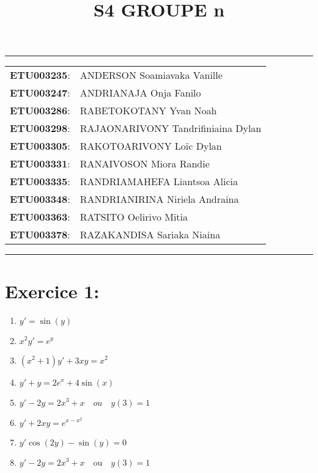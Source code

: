 \documentclass[a4paper,12pt]{article}
\begin{document}
	
\title{\textbf{S4 GROUPE n}}
\date{}
\maketitle

\hrule
\vspace{1em}

\begin{tabular}{rl}
	\textbf{ETU003235}: & ANDERSON Soamiavaka Vanille \\
	\textbf{ETU003247}: & ANDRIANAJA Onja Fanilo \\
	\textbf{ETU003286}: & RABETOKOTANY Yvan Noah \\
	\textbf{ETU003298}: & RAJAONARIVONY Tandrifiniaina Dylan \\
	\textbf{ETU003305}: & RAKOTOARIVONY Loïc Dylan \\
	\textbf{ETU003331}: & RANAIVOSON Miora Randie \\
	\textbf{ETU003335}: & RANDRIAMAHEFA Liantsoa Alicia \\
	\textbf{ETU003348}: & RANDRIANIRINA Niriela Andraina \\
	\textbf{ETU003363}: & RATSITO Oelirivo Mitia \\
	\textbf{ETU003378}: & RAZAKANDISA Sariaka Niaina \\
\end{tabular}

\vspace{1em}
\hrule

\newpage
\section*{Exercice 1:}
\begin{enumerate}
	\item $y\prime = \sin(y)$
	\item $x^2 y\prime = e^y$
	\item $(x^2 + 1) y\prime + 3xy = x^2$
	\item $y\prime + y = 2e^x + 4 \sin(x)$
	\item $y\prime - 2y = 2x^3 + x \quad ou \quad y(3)=1$
	\item $y\prime + 2xy = e^{x-x^2}$
	\item $y\prime \cos(2y) - \sin(y) = 0$
	\item $y' - 2y = 2x^3 + x \quad \text{ou} \quad y(3)=1$
\end{enumerate}
\end{document}
